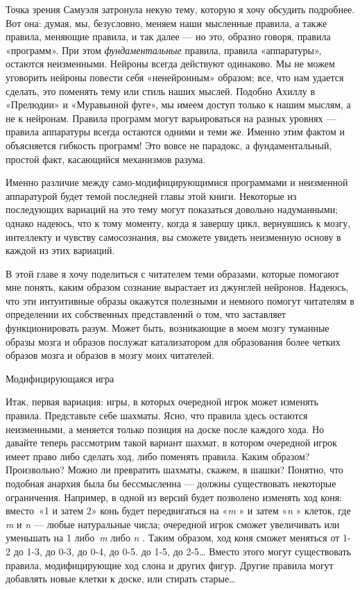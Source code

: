 Точка зрения Самуэля затронула некую тему, которую я хочу обсудить подробнее. Вот она: думая, мы, безусловно, меняем наши мысленные правила, а также правила, меняющие правила, и так далее --- но это, образно говоря, правила «программ». При этом \emph{фундаментальные} правила, правила «аппаратуры», остаются неизменными. Нейроны всегда действуют одинаково. Мы не можем уговорить нейроны повести себя «ненейронным» образом; все, что нам удается сделать, это поменять тему или стиль наших мыслей. Подобно Ахиллу в «Прелюдии» и «Муравьиной фуге», мы имеем доступ только к нашим мыслям, а не к нейронам. Правила программ могут варьироваться на разных уровнях --- правила аппаратуры всегда остаются одними и теми же. Именно этим фактом и объясняется гибкость программ! Это вовсе не парадокс, а фундаментальный, простой факт, касающийся механизмов разума.

Именно различие между само-модифицирующимися программами и неизменной аппаратурой будет темой последней главы этой книги. Некоторые из последующих вариаций на это тему могут показаться довольно надуманными; однако надеюсь, что к тому моменту, когда я завершу цикл, вернувшись к мозгу, интеллекту и чувству самосознания, вы сможете увидеть неизменную основу в каждой из этих вариаций.

В этой главе я хочу поделиться с читателем теми образами, которые помогают мне понять, каким образом сознание вырастает из джунглей нейронов. Надеюсь, что эти интуитивные образы окажутся полезными и немного помогут читателям в определении их собственных представлений о том, что заставляет функционировать разум. Может быть, возникающие в моем мозгу туманные образы мозга и образов послужат катализатором для образования более четких образов мозга и образов в мозгу моих читателей.

Модифицирующаяся игра

Итак, первая вариация: игры, в которых очередной игрок может изменять правила. Представьте себе шахматы. Ясно, что правила здесь остаются неизменными, а меняется только позиция на доске после каждого хода. Но давайте теперь рассмотрим такой вариант шахмат, в котором очередной игрок имеет право либо сделать ход, либо поменять правила. Каким образом? Произвольно? Можно ли превратить шахматы, скажем, в шашки? Понятно, что подобная анархия была бы бессмысленна --- должны существовать некоторые ограничения. Например, в одной из версий будет позволено изменять ход коня: вместо~«1 и затем 2» конь будет передвигаться на «\emph{m} » и затем «\emph{n} » клеток, где \emph{m} и \emph{n} --- любые натуральные числа; очередной игрок сможет увеличивать или уменьшать на 1 либо~\emph{m} либо \emph{n} . Таким образом, ход коня сможет меняться от 1-2 до 1-3, до 0-3, до 0-4, до 0-5. до 1-5, до 2-5\ldots{} Вместо этого могут существовать правила, модифицирующие ход слона и других фигур. Другие правила могут добавлять новые клетки к доске, или стирать старые\ldots{}

